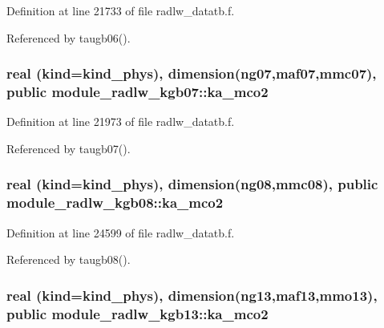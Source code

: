 Definition at line 21733 of file radlw\+\_\+datatb.\+f.



Referenced by taugb06().

\subsubsection[{\texorpdfstring{ka\+\_\+mco2}{ka_mco2}}]{\setlength{\rightskip}{0pt plus 5cm}real (kind=kind\+\_\+phys), dimension(ng07,maf07,mmc07), public module\+\_\+radlw\+\_\+kgb07\+::ka\+\_\+mco2}\hypertarget{group__module__radlw__main_ga3fdad494f3d3fcf9306da6a81d97bd43}{}\label{group__module__radlw__main_ga3fdad494f3d3fcf9306da6a81d97bd43}


Definition at line 21973 of file radlw\+\_\+datatb.\+f.



Referenced by taugb07().

\subsubsection[{\texorpdfstring{ka\+\_\+mco2}{ka_mco2}}]{\setlength{\rightskip}{0pt plus 5cm}real (kind=kind\+\_\+phys), dimension(ng08,mmc08), public module\+\_\+radlw\+\_\+kgb08\+::ka\+\_\+mco2}\hypertarget{group__module__radlw__main_ga0fcd13503b3253ec6aab0aa52056f634}{}\label{group__module__radlw__main_ga0fcd13503b3253ec6aab0aa52056f634}


Definition at line 24599 of file radlw\+\_\+datatb.\+f.



Referenced by taugb08().

\subsubsection[{\texorpdfstring{ka\+\_\+mco2}{ka_mco2}}]{\setlength{\rightskip}{0pt plus 5cm}real (kind=kind\+\_\+phys), dimension(ng13,maf13,mmo13), public module\+\_\+radlw\+\_\+kgb13\+::ka\+\_\+mco2}\hypertarget{group__module__radlw__main_ga523a0bc861ea861869f59b7bd007ff50}{}\label{group__module__radlw__main_ga523a0bc861ea861869f59b7bd007ff50}


